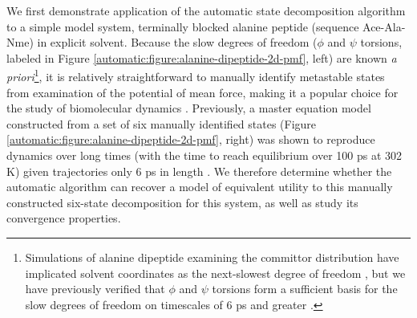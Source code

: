 We first demonstrate application of the automatic state decomposition algorithm to a simple model system, terminally blocked alanine peptide (sequence Ace-Ala-Nme) in explicit solvent.
Because the slow degrees of freedom ($\phi$ and $\psi$ torsions, labeled in Figure \ref{automatic:figure:alanine-dipeptide-2d-pmf}, left) are known \emph{a priori}\footnote{Simulations of alanine dipeptide examining the committor distribution have implicated solvent coordinates as the next-slowest degree of freedom \cite{bolhuis:2000a,ma:2005a}, but we have previously verified that $\phi$ and $\psi$ torsions form a sufficient basis for the slow degrees of freedom on timescales of 6 ps and greater \cite{chodera:mms:2006}.}, it is relatively straightforward to manually identify metastable states from examination of the potential of mean force, making it a popular choice for the study of biomolecular dynamics \cite{apostolakis:1999a,bolhuis:2000a,mortenson:2001a,hummer:2003a,chekmarev:2004a,chodera:mms:2006}.
Previously, a master equation model constructed from a set of six manually identified states (Figure \ref{automatic:figure:alanine-dipeptide-2d-pmf}, right) was shown to reproduce dynamics over long times (with the time to reach equilibrium over 100 ps at 302 K) given trajectories only 6 ps in length \cite{chodera:mms:2006}.
We therefore determine whether the automatic algorithm can recover a model of equivalent utility to this manually constructed six-state decomposition for this system, as well as study its convergence properties.

